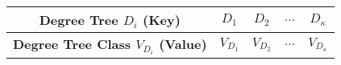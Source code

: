 
\begin{tabular}{c || cccc}
	\textbf{Degree Tree \(D_i\) (Key)} & \(D_1\) & \(D_2\) & \(\dots\) & \(D_{\kappa}\) \\
	\hline
	\textbf{Degree Tree Class \(V_{D_i}\) (Value)} & \(V_{D_1}\) & \(V_{D_2}\) & \(\dots\) & \(V_{D_{\kappa}}\) \\
\end{tabular}
